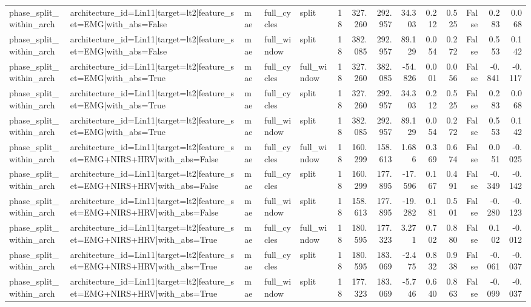 \begin{table}
\begin{tabular}{lllllrrrrrrrrr}
phase_split_within_arch & architecture_id=Lin11|target=lt2|feature_set=EMG|with_abs=False & mae & full_cycles & split & 18 & 327.260 & 292.957 & 34.303 & 0.212 & 0.525 & False & 0.283 & 0.068 \\
phase_split_within_arch & architecture_id=Lin11|target=lt2|feature_set=EMG|with_abs=False & mae & full_window & split & 18 & 382.085 & 292.957 & 89.129 & 0.054 & 0.272 & False & 0.553 & 0.142 \\
phase_split_within_arch & architecture_id=Lin11|target=lt2|feature_set=EMG|with_abs=True & mae & full_cycles & full_window & 18 & 327.260 & 382.085 & -54.826 & 0.001 & 0.056 & False & -0.841 & -0.117 \\
phase_split_within_arch & architecture_id=Lin11|target=lt2|feature_set=EMG|with_abs=True & mae & full_cycles & split & 18 & 327.260 & 292.957 & 34.303 & 0.212 & 0.525 & False & 0.283 & 0.068 \\
phase_split_within_arch & architecture_id=Lin11|target=lt2|feature_set=EMG|with_abs=True & mae & full_window & split & 18 & 382.085 & 292.957 & 89.129 & 0.054 & 0.272 & False & 0.553 & 0.142 \\
phase_split_within_arch & architecture_id=Lin11|target=lt2|feature_set=EMG+NIRS+HRV|with_abs=False & mae & full_cycles & full_window & 18 & 160.299 & 158.613 & 1.686 & 0.369 & 0.674 & False & 0.051 & -0.025 \\
phase_split_within_arch & architecture_id=Lin11|target=lt2|feature_set=EMG+NIRS+HRV|with_abs=False & mae & full_cycles & split & 18 & 160.299 & 177.895 & -17.596 & 0.167 & 0.491 & False & -0.349 & -0.142 \\
phase_split_within_arch & architecture_id=Lin11|target=lt2|feature_set=EMG+NIRS+HRV|with_abs=False & mae & full_window & split & 18 & 158.613 & 177.895 & -19.282 & 0.181 & 0.501 & False & -0.280 & -0.123 \\
phase_split_within_arch & architecture_id=Lin11|target=lt2|feature_set=EMG+NIRS+HRV|with_abs=True & mae & full_cycles & full_window & 18 & 180.595 & 177.323 & 3.271 & 0.702 & 0.880 & False & 0.102 & -0.012 \\
phase_split_within_arch & architecture_id=Lin11|target=lt2|feature_set=EMG+NIRS+HRV|with_abs=True & mae & full_cycles & split & 18 & 180.595 & 183.069 & -2.475 & 0.832 & 0.938 & False & -0.061 & -0.037 \\
phase_split_within_arch & architecture_id=Lin11|target=lt2|feature_set=EMG+NIRS+HRV|with_abs=True & mae & full_window & split & 18 & 177.323 & 183.069 & -5.746 & 0.640 & 0.863 & False & -0.099 & -0.037 \\

\end{tabular}
\end{table}
